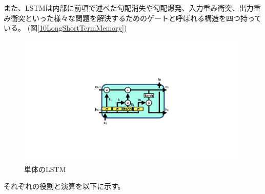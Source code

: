 また、LSTMは内部に前項で述べた勾配消失や勾配爆発、入力重み衝突、出力重み衝突といった様々な問題を解決するためのゲートと呼ばれる構造を四つ持っている。 (図\ref{10LongShortTermMemory})

\begin{figure}[htbp]
 \centering
 \includegraphics[trim = 0 300 0 300, width=1.0\textwidth, clip]{Figure/2DeepLearning/11LSTM.png}
 \caption{単体のLSTM}
 \label{11LSTM}
\end{figure}

それぞれの役割と演算を以下に示す。

